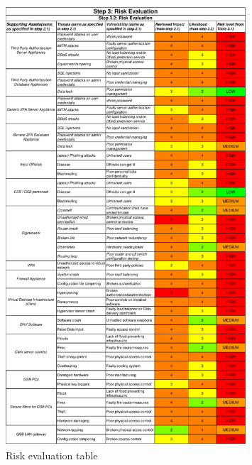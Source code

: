\begin{figure}[]
    \centering
    \includegraphics[keepaspectratio,width=0.8\textwidth]{03-risk-analysis/004-RE/img/riskEval.pdf}
    \caption{Risk evaluation table}
    \label{fig:riskEval}
\end{figure}